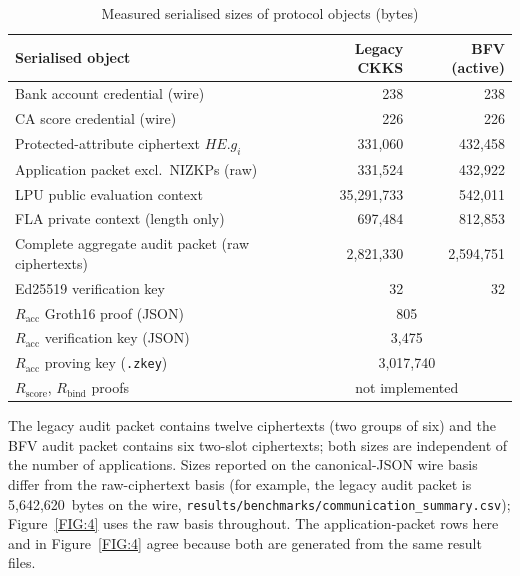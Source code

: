 \documentclass[a4paper,fleqn]{cas-dc}
\begin{document}
\begin{table}[htbp]
\centering
\caption{Measured serialised sizes of protocol objects (bytes)}
\label{tab:serialized_sizes}
\scriptsize
\renewcommand{\arraystretch}{1.15}
\begin{tabular}{lrr}
\hline
\textbf{Serialised object} & \textbf{Legacy CKKS} & \textbf{BFV (active)} \\
\hline
Bank account credential (wire) & 238 & 238 \\
CA score credential (wire) & 226 & 226 \\
Protected-attribute ciphertext $HE.g_i$ & 331{,}060 & 432{,}458 \\
Application packet excl.\ NIZKPs (raw) & 331{,}524 & 432{,}922 \\
LPU public evaluation context & 35{,}291{,}733 & 542{,}011 \\
FLA private context (length only) & 697{,}484 & 812{,}853 \\
Complete aggregate audit packet (raw ciphertexts) & 2{,}821{,}330 & 2{,}594{,}751 \\
Ed25519 verification key & 32 & 32 \\
$R_{\mathrm{acc}}$ Groth16 proof (JSON) & \multicolumn{2}{c}{805} \\
$R_{\mathrm{acc}}$ verification key (JSON) & \multicolumn{2}{c}{3{,}475} \\
$R_{\mathrm{acc}}$ proving key (\texttt{.zkey}) & \multicolumn{2}{c}{3{,}017{,}740} \\
$R_{\mathrm{score}}$, $R_{\mathrm{bind}}$ proofs & \multicolumn{2}{c}{not implemented} \\
\hline
\end{tabular}
\end{table}

The legacy audit packet contains twelve ciphertexts (two groups of six) and the BFV audit packet contains six two-slot ciphertexts; both sizes are independent of the number of applications. Sizes reported on the canonical-JSON wire basis differ from the raw-ciphertext basis (for example, the legacy audit packet is 5{,}642{,}620~bytes on the wire, \texttt{results/benchmarks/communication\_summary.csv}); Figure~\ref{FIG:4} uses the raw basis throughout. The application-packet rows here and in Figure~\ref{FIG:4} agree because both are generated from the same result files.
\end{document}
